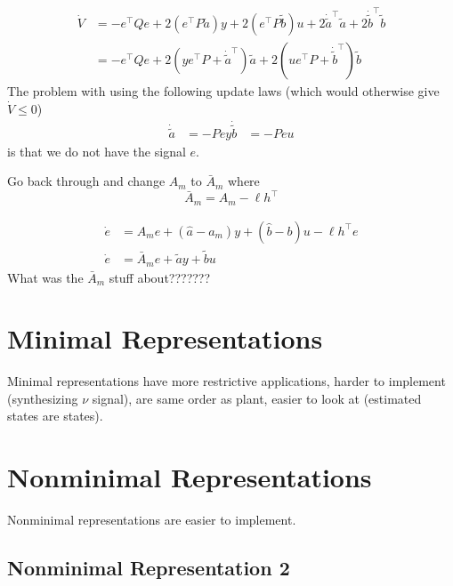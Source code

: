 \begin{align*}
  \dot{V}&=-e^{\top}Qe+2(e^{\top}P\tilde{a})y+2(e^{\top}P\tilde{b})u+2\dot{\tilde{a}}^{\top}\tilde{a}+2\dot{\tilde{b}}^{\top}\tilde{b} \\
  &=-e^{\top}Qe+2(ye^{\top}P+\dot{\tilde{a}}^{\top})\tilde{a}+2(ue^{\top}P+\dot{\tilde{b}}^{\top})\tilde{b}
\end{align*}
The problem with using the following update laws (which would otherwise give $\dot{V}\leq0$)
\begin{align*}
  \dot{\tilde{a}}&=-Pey
  \dot{\tilde{b}}&=-Peu
\end{align*}
is that we do not have the signal $e$.

Go back through and change $A_{m}$ to $\bar{A}_{m}$ where
\begin{equation*}
  \bar{A}_{m}=A_{m}-\ell h^{\top}
\end{equation*}

\begin{align*}
  \dot{e}&=A_{m}e+(\hat{a}-a_{m})y+(\hat{b}-b)u-\ell h^{\top}e \\
  \dot{e}&=\bar{A}_{m}e+\tilde{a}y+\tilde{b}u
\end{align*}
What was the $\bar{A}_{m}$ stuff about???????

\section{Minimal Representations}

Minimal representations have more restrictive applications, harder to implement (synthesizing $\nu$ signal), are same order as plant, easier to look at (estimated states are states).

\section{Nonminimal Representations}

Nonminimal representations are easier to implement.

\subsection{Nonminimal Representation 2}

